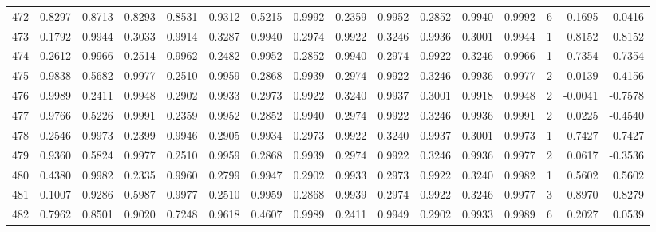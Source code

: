 \begin{tabular}{lrrrrrrrrrrrrrrr}
472 &      0.8297 &  0.8713 &  0.8293 &  0.8531 &  0.9312 &  0.5215 &  0.9992 &  0.2359 &  0.9952 &  0.2852 &   0.9940 &     0.9992 &      6 &                    0.1695 &                     0.0416 \\
473 &      0.1792 &  0.9944 &  0.3033 &  0.9914 &  0.3287 &  0.9940 &  0.2974 &  0.9922 &  0.3246 &  0.9936 &   0.3001 &     0.9944 &      1 &                    0.8152 &                     0.8152 \\
474 &      0.2612 &  0.9966 &  0.2514 &  0.9962 &  0.2482 &  0.9952 &  0.2852 &  0.9940 &  0.2974 &  0.9922 &   0.3246 &     0.9966 &      1 &                    0.7354 &                     0.7354 \\
475 &      0.9838 &  0.5682 &  0.9977 &  0.2510 &  0.9959 &  0.2868 &  0.9939 &  0.2974 &  0.9922 &  0.3246 &   0.9936 &     0.9977 &      2 &                    0.0139 &                    -0.4156 \\
476 &      0.9989 &  0.2411 &  0.9948 &  0.2902 &  0.9933 &  0.2973 &  0.9922 &  0.3240 &  0.9937 &  0.3001 &   0.9918 &     0.9948 &      2 &                   -0.0041 &                    -0.7578 \\
477 &      0.9766 &  0.5226 &  0.9991 &  0.2359 &  0.9952 &  0.2852 &  0.9940 &  0.2974 &  0.9922 &  0.3246 &   0.9936 &     0.9991 &      2 &                    0.0225 &                    -0.4540 \\
478 &      0.2546 &  0.9973 &  0.2399 &  0.9946 &  0.2905 &  0.9934 &  0.2973 &  0.9922 &  0.3240 &  0.9937 &   0.3001 &     0.9973 &      1 &                    0.7427 &                     0.7427 \\
479 &      0.9360 &  0.5824 &  0.9977 &  0.2510 &  0.9959 &  0.2868 &  0.9939 &  0.2974 &  0.9922 &  0.3246 &   0.9936 &     0.9977 &      2 &                    0.0617 &                    -0.3536 \\
480 &      0.4380 &  0.9982 &  0.2335 &  0.9960 &  0.2799 &  0.9947 &  0.2902 &  0.9933 &  0.2973 &  0.9922 &   0.3240 &     0.9982 &      1 &                    0.5602 &                     0.5602 \\
481 &      0.1007 &  0.9286 &  0.5987 &  0.9977 &  0.2510 &  0.9959 &  0.2868 &  0.9939 &  0.2974 &  0.9922 &   0.3246 &     0.9977 &      3 &                    0.8970 &                     0.8279 \\
482 &      0.7962 &  0.8501 &  0.9020 &  0.7248 &  0.9618 &  0.4607 &  0.9989 &  0.2411 &  0.9949 &  0.2902 &   0.9933 &     0.9989 &      6 &                    0.2027 &                     0.0539 \\

\end{tabular}
